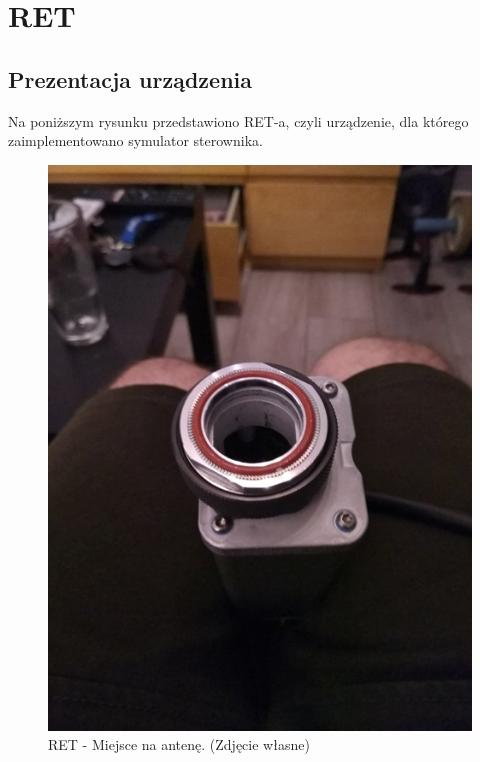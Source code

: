 \chapter{RET}
	\section{Prezentacja urządzenia}
		Na poniższym rysunku przedstawiono RET-a, czyli urządzenie, dla którego zaimplementowano symulator sterownika.\cite{KATHREIN_RET_1}
		\begin{figure}[h!]
			\centering
			\includegraphics[scale=0.4]{Obrazki/RET_1.png}
			\caption{RET - Miejsce na antenę.
				\newline(Zdjęcie własne)}
		\end{figure}


